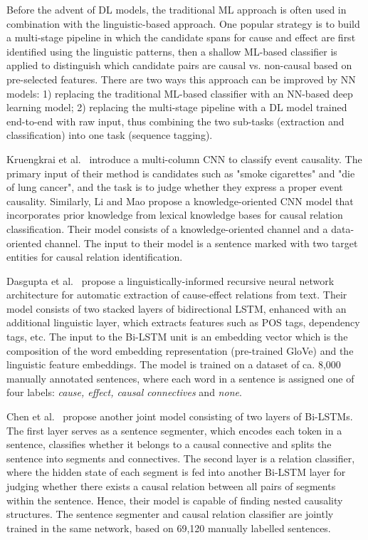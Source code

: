Before the advent of DL models, the traditional ML approach is often used in combination with the linguistic-based approach. One popular strategy is to build a multi-stage pipeline in which the candidate spans for cause and effect are first identified using the linguistic patterns, then a shallow ML-based classifier is applied to distinguish which candidate pairs are causal vs. non-causal based on pre-selected features. There are two ways this approach can be improved by NN models: 1) replacing the traditional ML-based classifier with an NN-based deep learning model; 2) replacing the multi-stage pipeline with a DL model trained end-to-end with raw input, thus combining the two sub-tasks (extraction and classification) into one task (sequence tagging).

Kruengkrai et al.~\cite{Kruengkrai17} introduce a multi-column CNN to classify event causality. The primary input of their method is candidates such as "smoke cigarettes" and "die of lung cancer", and the task is to judge whether they express a proper event causality. Similarly, Li and Mao \cite{LiMao19} propose a knowledge-oriented CNN model that incorporates prior knowledge from lexical knowledge bases for causal relation classification. Their model consists of a knowledge-oriented channel and a data-oriented channel. The input to their model is a sentence marked with two target entities for causal relation identification. 

Dasgupta et al.~\cite{dasgupta18} propose a linguistically-informed recursive neural network architecture for automatic extraction of cause-effect relations from text. Their model consists of two stacked layers of bidirectional LSTM, enhanced with an additional linguistic layer, which extracts features such as POS tags, dependency tags, etc. The input to the Bi-LSTM unit is an embedding vector which is the composition of the word embedding representation (pre-trained GloVe) and the linguistic feature embeddings. The model is trained on a dataset of ca. 8,000 manually annotated sentences, where each word in a sentence is assigned one of four labels: \emph{cause, effect, causal connectives} and \emph{none}. 

Chen et al.~\cite{Chen20} propose another joint model consisting of two layers of Bi-LSTMs. The first layer serves as a sentence segmenter, which encodes each token in a sentence, classifies whether it belongs to a causal connective and splits the sentence into segments and connectives. The second layer is a relation classifier, where the hidden state of each segment is fed into another Bi-LSTM layer for judging whether there exists a causal relation between all pairs of segments within the sentence. Hence, their model is capable of finding nested causality structures. The sentence segmenter and causal relation classifier are jointly trained in the same network, based on 69,120 manually labelled sentences.

